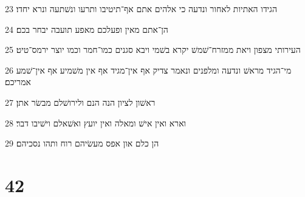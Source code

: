 \par 23 הגידו האתיות לאחור ונדעה כי אלהים אתם אף־תיטיבו ותרעו ונשׁתעה ונרא יחדו׃
\par 24 הן־אתם מאין ופעלכם מאפע תועבה יבחר בכם׃
\par 25 העירותי מצפון ויאת ממזרח־שׁמשׁ יקרא בשׁמי ויבא סגנים כמו־חמר וכמו יוצר ירמס־טיט׃
\par 26 מי־הגיד מראשׁ ונדעה ומלפנים ונאמר צדיק אף אין־מגיד אף אין משׁמיע אף אין־שׁמע אמריכם׃
\par 27 ראשׁון לציון הנה הנם ולירושׁלם מבשׂר אתן׃
\par 28 וארא ואין אישׁ ומאלה ואין יועץ ואשׁאלם וישׁיבו דבר׃
\par 29 הן כלם און אפס מעשׂיהם רוח ותהו נסכיהם׃

\chapter{42}


